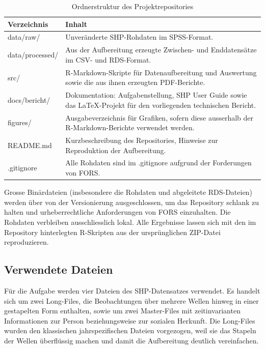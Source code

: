 \begin{table}[h]
\centering
\caption{Ordnerstruktur des Projektrepositories}
\label{tab:ordnerstruktur}
\begin{tabularx}{\textwidth}{lX}
\toprule
Verzeichnis & Inhalt \\
\midrule
data/raw/           & Unveränderte SHP-Rohdaten im SPSS-Format. \\

data/processed/     & Aus der Aufbereitung erzeugte Zwischen- und Enddatensätze im CSV- und RDS-Format. \\

src/                & R-Markdown-Skripte für Datenaufbereitung und Auswertung sowie die aus ihnen erzeugten PDF-Berichte. \\

docs/bericht/       & Dokumentation: Aufgabenstellung, SHP User Guide sowie das \LaTeX-Projekt für den vorliegenden technischen Bericht. \\

figures/            & Ausgabeverzeichnis für Grafiken, sofern diese ausserhalb der R-Markdown-Berichte verwendet werden. \\

README.md           & Kurzbeschreibung des Repositories, Hinweise zur Reproduktion der Aufbereitung. \\

.gitignore          & Alle Rohdaten sind im .gitignore aufgrund der Forderungen von FORS. \\
\bottomrule
\end{tabularx}
\end{table}

Grosse Binärdateien (insbesondere die Rohdaten und abgeleitete RDS-Dateien) werden über 
von der Versionierung ausgeschlossen, um das Repository schlank zu halten und
urheberrechtliche Anforderungen von FORS einzuhalten. Die Rohdaten verbleiben
ausschliesslich lokal. Alle Ergebnisse lassen sich mit den im Repository hinterlegten
R-Skripten aus der ursprünglichen ZIP-Datei reproduzieren.

\subsection{Verwendete Dateien}
\label{subsec:dateien}

Für die Aufgabe werden vier Dateien des SHP-Datensatzes verwendet. Es handelt sich um
zwei Long-Files, die Beobachtungen über mehrere Wellen hinweg in einer gestapelten
Form enthalten, sowie um zwei Master-Files mit zeitinvarianten Informationen zur Person
beziehungsweise zur sozialen Herkunft. Die Long-Files wurden den klassischen
jahrspezifischen Dateien vorgezogen, weil sie das Stapeln der Wellen überflüssig machen
und damit die Aufbereitung deutlich vereinfachen.

